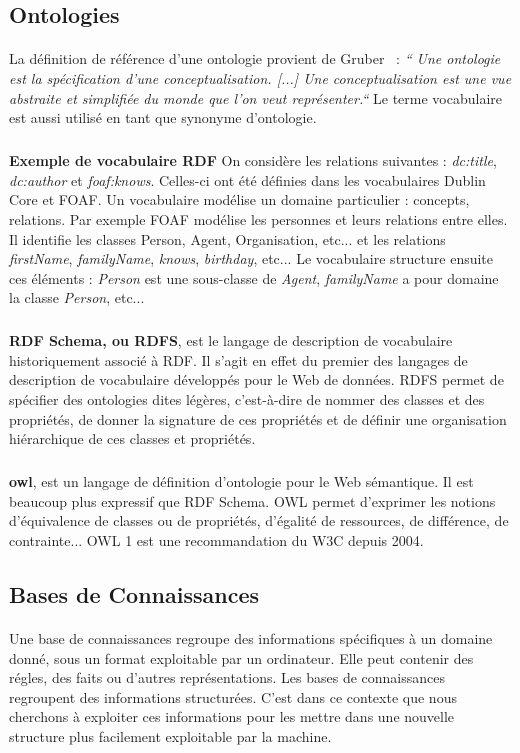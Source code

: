 \documentclass[12pt,a4]{report}
\begin{document}
\subsection{Ontologies}
\paragraph{}
La définition de référence d’une ontologie provient de Gruber~\cite{gruber1995}  :  {\it `` Une ontologie est la spécification d’une conceptualisation. [...] Une conceptualisation est une vue abstraite et simplifiée du monde que l’on veut représenter.``} Le terme vocabulaire est aussi utilisé en tant que synonyme d’ontologie.
\subparagraph{}
\textbf{Exemple de vocabulaire RDF} On considère les relations suivantes : \textit{dc:title}, \textit{dc:author} et \textit{foaf:knows}. Celles-ci ont été définies dans les vocabulaires Dublin Core et FOAF. Un vocabulaire modélise un domaine particulier : concepts, relations. Par exemple FOAF modélise les personnes et leurs relations entre elles. Il identifie les classes Person, Agent, Organisation, etc... et les relations \textit{firstName}, \textit{familyName}, \textit{knows}, \textit{birthday}, etc... Le vocabulaire structure ensuite ces  éléments : \textit{Person} est une sous-classe de \textit{Agent}, \textit{familyName} a pour domaine la classe \textit{Person}, etc...
\subparagraph{}
\textbf{RDF Schema, ou RDFS}, est le langage de description de vocabulaire historiquement associé à RDF. Il s'agit en effet du premier des langages de description de vocabulaire développés pour le Web de données. RDFS permet de spécifier des ontologies dites légères, c'est-à-dire de nommer des classes et des propriétés, de donner la signature de ces propriétés et de définir une organisation hiérarchique de ces classes et propriétés.
\subparagraph{}
\textbf{\gls{owl}}, est un langage de définition d'ontologie pour le Web sémantique. Il est beaucoup plus expressif que RDF Schema. OWL permet d'exprimer les notions d'équivalence de classes ou de propriétés, d'égalité de ressources, de différence, de contrainte... OWL 1 est une recommandation du W3C depuis 2004.
\newpage
\subsection{Bases de Connaissances}
\paragraph{}
Une base de connaissances regroupe des informations spécifiques à un domaine donné, sous un format exploitable par un ordinateur. Elle peut contenir des régles, des faits ou d'autres représentations. Les bases de connaissances regroupent des informations structurées. C’est dans ce contexte que nous cherchons à exploiter ces informations pour les mettre dans une nouvelle structure plus facilement exploitable par la machine. 
\end{document}
